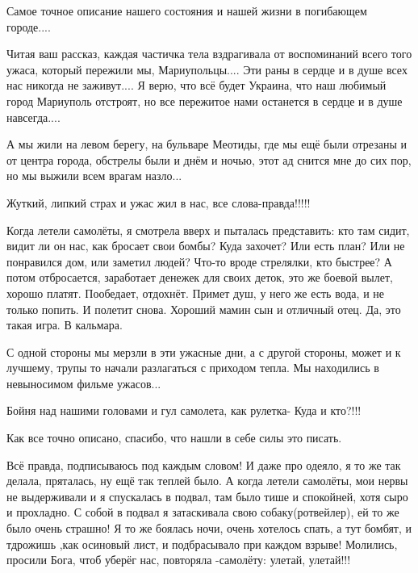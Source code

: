 \begin{itemize}

Самое точное описание нашего состояния и нашей жизни в погибающем городе....


Читая ваш рассказ, каждая частичка тела вздрагивала от воспоминаний всего того
ужаса, который пережили мы, Мариупольцы.... Эти раны в сердце и в душе всех нас
никогда не заживут.... Я верю, что всё будет Украина, что наш любимый город
Мариуполь отстроят, но все пережитое нами останется в сердце и в душе
навсегда....


А мы жили на левом берегу, на бульваре Меотиды, где мы ещё были отрезаны и от
центра города, обстрелы были и днём и ночью, этот ад снится мне до сих пор, но
мы выжили всем врагам назло...

Жуткий, липкий страх и ужас жил в нас, все слова-правда!!!!!


Когда летели самолёты, я смотрела вверх и пыталась представить: кто там сидит,
видит ли он нас, как бросает свои бомбы? Куда захочет? Или есть план? Или не
понравился дом, или заметил людей? Что-то вроде стрелялки, кто быстрее? А потом
отбросается, заработает денежек для своих деток, это же боевой вылет, хорошо
платят. Пообедает, отдохнёт. Примет душ, у него же есть вода, и не только
попить. И полетит снова. Хороший мамин сын и отличный отец. Да, это такая игра.
В кальмара.


С одной стороны мы мерзли в эти ужасные дни, а с другой стороны, может и к
лучшему, трупы то начали разлагаться с приходом тепла. Мы находились в
невыносимом фильме ужасов...

Бойня над нашими головами и гул самолета, как рулетка- Куда и кто?!!!

Как все точно описано, спасибо, что нашли в себе силы это писать.


Всё правда, подписываюсь под каждым словом! И даже про одеяло, я то же так
делала, пряталась, ну ещё так теплей было. А когда летели самолёты, мои нервы не
выдерживали и я спускалась в подвал, там было тише и спокойней, хотя сыро и
прохладно. С собой в подвал я затаскивала свою собаку(ротвейлер), ей то же было
очень страшно! Я то же боялась ночи, очень хотелось спать, а тут бомбят, и тдрожишь
,как осиновый лист, и подбрасывало при каждом взрыве! Молились, просили Бога, чтоб
уберёг нас, повторяла -самолёту: улетай, улетай!!!


\end{itemize}
